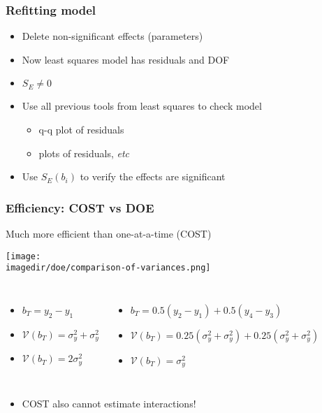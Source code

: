 \begin{frame}\frametitle{Refitting model}
	\begin{itemize}
		\item	Delete non-significant effects (parameters)
		\item	Now least squares model has residuals and DOF
		\item	$S_E \neq 0$
		\item	Use all previous tools from least squares to check model
		\begin{itemize}
			\item	q-q plot of residuals
			\item	plots of residuals, \emph{etc}
		\end{itemize}
		\item	Use $S_E(b_i)$ to verify the effects are significant
	\end{itemize}
\end{frame}

\begin{frame}\frametitle{Efficiency: COST vs DOE}
	\begin{block}{Much more efficient than one-at-a-time (COST)}
		\begin{center}
			\texttt{[image: \\imagedir/doe/comparison-of-variances.png]}
		\end{center}
	\end{block}
	\begin{columns}
		\column{3cm}
			\begin{itemize}
				\item	$b_T = y_2 - y_1$
				\item	$\mathcal{V}(b_T) = \sigma_y^2 + \sigma_y^2$
				\item	$\mathcal{V}(b_T) = 2\sigma_y^2$
			\end{itemize}
		\column{7cm}
			\begin{itemize}
				\item	$b_T = 0.5(y_2 - y_1) + 0.5(y_4 - y_3)$
				\item	$\mathcal{V}(b_T) = 0.25(\sigma_y^2 + \sigma_y^2) + 0.25(\sigma_y^2 + \sigma_y^2)$
				\item	$\mathcal{V}(b_T) = \sigma_y^2$
			\end{itemize}
	\end{columns}
	\begin{itemize}
		\item	COST also cannot estimate interactions!
	\end{itemize}
\end{frame}


